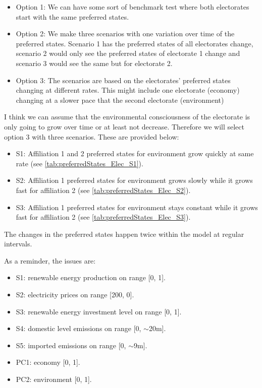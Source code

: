 \begin{itemize}
\item Option 1: We can have some sort of benchmark test where both electorates start with the same preferred states.
\item Option 2: We make three scenarios with one variation over time of the preferred states. Scenario 1 has the preferred states of all electorates change, scenario 2 would only see the preferred states of electorate 1 change and scenario 3 would see the same but for electorate 2.
\item Option 3: The scenarios are based on the electorates' preferred states changing at different rates. This might include one electorate (economy) changing at a slower pace that the second electorate (environment)
\end{itemize}

I think we can assume that the environmental consciousness of the electorate is only going to grow over time or at least not decrease. Therefore we will select option 3 with three scenarios. These are provided below:

\begin{itemize}
\item S1: Affiliation 1 and 2 preferred states for environment grow quickly at same rate (see \autoref{tab:preferredStates_Elec_S1}).
\item S2: Affiliation 1 preferred states for environment grows slowly while it grows fast for affiliation 2 (see \autoref{tab:preferredStates_Elec_S2}).
\item S3: Affiliation 1 preferred states for environment stays constant while it grows fast for affiliation 2 (see \autoref{tab:preferredStates_Elec_S3}).
\end{itemize}

The changes in the preferred states happen twice within the model at regular intervals.

As a reminder, the issues are: 

\begin{itemize}
\item S1: renewable energy production on range [0, 1].
\item S2: electricity prices on range [200, 0]. %
\item S3: renewable energy investment level on range [0, 1].
\item S4: domestic level emissions on range [0, $\sim$20m].
\item S5: imported emissions on range [0, $\sim$9m]. %
\item PC1: economy [0, 1]. %
\item PC2: environment [0, 1]. %
\end{itemize}

